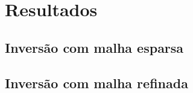 \chapter{Resultados}
\label{ch:resultados}

\section{Inversão com malha esparsa}




\section{Inversão com malha refinada}






